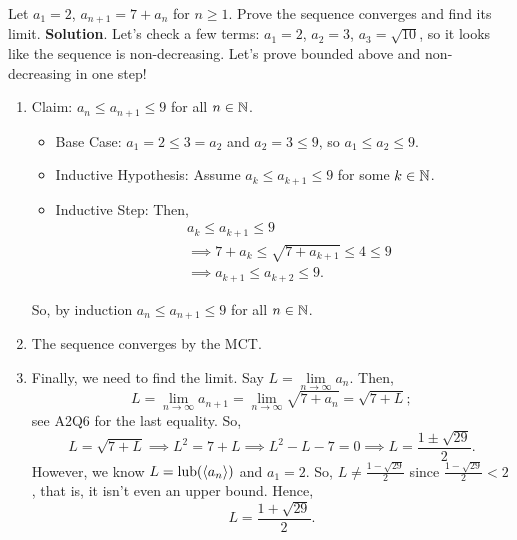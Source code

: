 \begin{Example}{}{}
    Let $ a_1=2 $, $ a_{n+1}=7+a_n $ for $ n\ge 1 $. Prove
    the sequence converges and find its limit.
    \tcblower{}
    \textbf{Solution}. Let's check a few terms: $ a_1=2 $, $ a_2=3 $, $ a_3=\sqrt{10} $,
    so it looks like the sequence is non-decreasing. Let's prove
    bounded above and non-decreasing in one step!
    \begin{enumerate}[(1)]
        \item Claim: $ a_n\le a_{n+1}\le 9 $ for all $ n\in \mathbb{N} $.
              \begin{itemize}
                  \item Base Case: $ a_1=2\le 3=a_2 $ and $ a_2=3\le 9 $,
                        so $ a_1\le a_2\le 9 $.
                  \item Inductive Hypothesis: Assume
                        $ a_k\le a_{k+1}\le 9 $ for some $ k\in \mathbb{N} $.
                  \item Inductive Step: Then,
                        \begin{align*}
                             & a_k\le a_{k+1}\le 9                          \\
                             & \implies 7+a_k\le \sqrt{7+a_{k+1}}\le 4\le 9 \\
                             & \implies a_{k+1}\le a_{k+2}\le 9.
                        \end{align*}
              \end{itemize}
              So, by induction $ a_n\le a_{n+1}\le 9 $ for all $ n\in \mathbb{N} $.
        \item The sequence converges by the MCT\@.
        \item Finally, we need to find the limit. Say $ L=\lim\limits_{{n} \to {\infty}}a_n $.
              Then,
              \[ L=\lim\limits_{{n} \to {\infty}}a_{n+1}=\lim\limits_{{n} \to {\infty}}\sqrt{7+a_n}=\sqrt{7+L}; \]
              see A2Q6 for the last equality. So,
              \[ L=\sqrt{7+L}\implies L^2=7+L\implies L^2-L-7=0\implies L=\frac{1\pm \sqrt{29}}{2}. \]
              However, we know $ L=\mathrm{lub}(\langle a_n\rangle) $ and $ a_1=2 $. So, $ L\ne \frac{1-\sqrt{29}}{2} $
              since $ \frac{1-\sqrt{29}}{2}<2 $, that is, it isn't even an upper bound. Hence,
              \[ L=\frac{1+\sqrt{29}}{2}. \]
    \end{enumerate}
\end{Example}